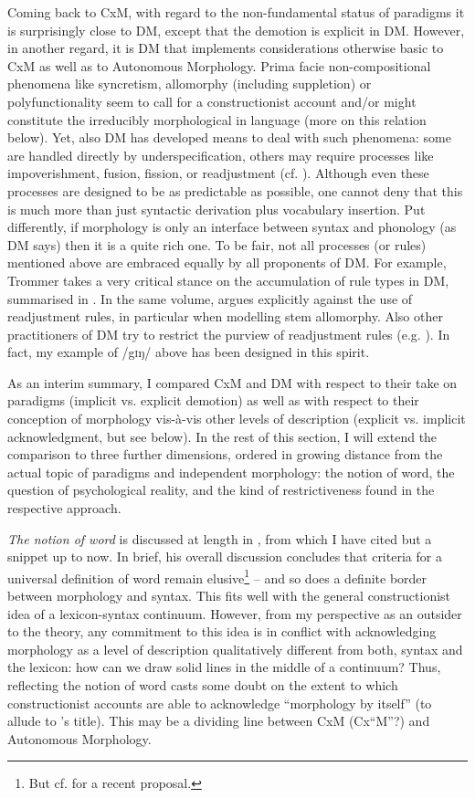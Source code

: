 \documentclass[output=paper]{langsci/langscibook}
\begin{document}
Coming back to CxM, with regard to the non-fundamental status of paradigms it is surprisingly close to DM, except that the demotion is explicit in DM. However, in another regard, it is DM that implements considerations otherwise basic to CxM as well as to Autonomous Morphology. Prima facie non-compositional phenomena like syncretism, allomorphy (including suppletion) or polyfunctionality seem to call for a constructionist account and/or might constitute the irreducibly morphological in language (more on this relation below). Yet, also DM has developed means to deal with such phenomena: some are handled directly by underspecification, others may require processes like impoverishment, fusion, fission, or readjustment (cf. ). Although even these processes are designed to be as predictable as possible, one cannot deny that this is much more than just syntactic derivation plus vocabulary insertion. Put differently, if morphology is only an interface between syntax and phonology (as DM says) then it is a quite rich one. To be fair, not all processes (or rules) mentioned above are embraced equally by all proponents of DM. For example, Trommer takes a very critical stance on the accumulation of rule types in DM, summarised in \citet[61]{Trommer2016}. In the same volume, \citet{Haugen2016} argues explicitly against the use of readjustment rules, in particular when modelling stem allomorphy. Also other practitioners of DM try to restrict the purview of readjustment rules (e.g. \citealt[475]{PominoPomino2019}). In fact, my example of /g\textsc{i}ŋ/ above has been designed in this spirit.

As an interim summary, I compared CxM and DM with respect to their take on paradigms (implicit vs. explicit demotion) as well as with respect to their conception of morphology vis-à-vis other levels of description (explicit vs. implicit acknowledgment, but see below). In the rest of this section, I will extend the comparison to three further dimensions, ordered in growing distance from the actual topic of paradigms and independent morphology: the notion of word, the question of psychological reality, and the kind of restrictiveness found in the respective approach.

\textit{The notion of word} is discussed at length in \citet{Haspelmath2011}, from which I have cited but a snippet up to now. In brief, his overall discussion concludes that criteria for a universal definition of word remain elusive\footnote{But cf. \citet{Gil2020} for a recent proposal.} – and so does a definite border between morphology and syntax. This fits well with the general constructionist idea of a lexicon-syntax continuum. However, from my perspective as an outsider to the theory, any commitment to this idea is in conflict with acknowledging morphology as a level of description qualitatively different from both, syntax and the lexicon: how can we draw solid lines in the middle of a continuum? Thus, reflecting the notion of word casts some doubt on the extent to which constructionist accounts are able to acknowledge “morphology by itself” (to allude to \citeauthor{Aronoff1994}'s \citeyear{Aronoff1994} title). This may be a dividing line between CxM (Cx“M”?) and Autonomous Morphology.
\end{document}
